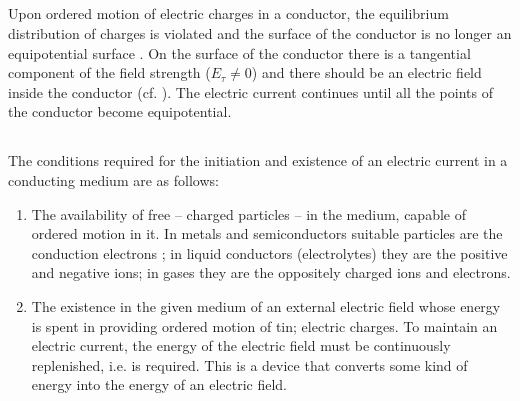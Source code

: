 \subsection{}\label{20.1.3} Upon ordered motion of electric charges in a conductor, the equilibrium distribution of charges is violated and the surface of the conductor is no longer an equipotential surface . On the surface of the conductor there is a tangential component of the field strength ($E_{\tau} \neq 0$) and there should be an electric field inside the conductor (cf. ). The electric current continues until all the points of the conductor become equipotential.

\subsection{}\label{20.1.4} The conditions required for the initiation and existence of an electric current in a conducting medium are as follows: 
\begin{enumerate}[label=(\alph*)]
\item The availability of free  -- charged particles -- in the medium, capable of ordered motion in it. In metals and semiconductors suitable particles are the conduction electrons ; in liquid conductors (electrolytes) they are the positive and negative ions; in gases they are the oppositely charged ions and electrons.
\item The existence in the given medium of an external electric field whose energy is spent in providing ordered motion of tin; electric charges. To maintain an electric current, the energy of the electric field must be continuously replenished, i.e.  is required. This is a device that converts some kind of energy into the energy of an electric field. 
\end{enumerate}

